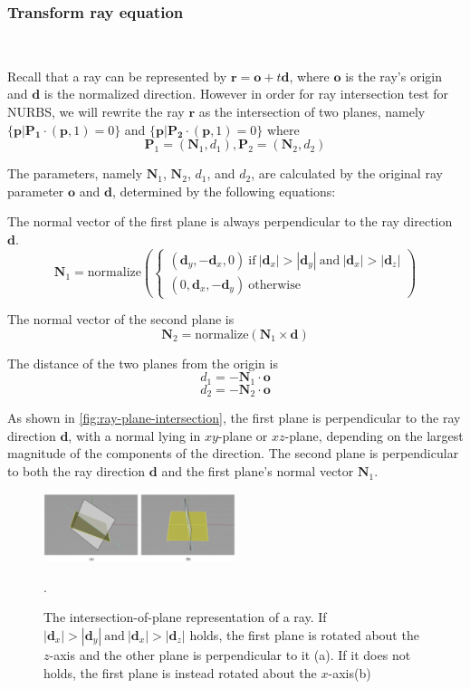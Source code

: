 \documentclass[acmtog]{acmart}
\begin{document}
\subsubsection{Transform ray equation}
\ 

Recall that a ray can be represented by $\mathbf{r} = \mathbf{o} + t \mathbf{d}$, where $\mathbf{o}$ is the ray's origin and $\mathbf{d}$ is the normalized direction. However in order for ray intersection test for NURBS, we will rewrite the ray $\mathbf{r}$ as the intersection of two planes, namely $\{ \mathbf{p} | \mathbf{P_1} \cdot (\mathbf{p}, 1) = 0 \}$ and $\{ \mathbf{p} | \mathbf{P_2} \cdot (\mathbf{p}, 1) = 0 \}$ where 
\[
	\mathbf{P}_1 = (\mathbf{N}_1, d_1), 
	\mathbf{P}_2 = (\mathbf{N}_2, d_2)	
\]

The parameters, namely $\mathbf{N}_1$, $\mathbf{N}_2$, $d_1$, and $d_2$, are calculated by the original ray parameter $\mathbf{o}$ and $\mathbf{d}$, determined by the following equations:

The normal vector of the first plane is always perpendicular to the ray direction $\mathbf{d}$.  
\[
	\mathbf{N}_1 = \mathrm{normalize}\left( \begin{cases}
		\left(\mathbf{d}_y, -\mathbf{d}_x, 0\right)
		\mathrm{\ if\ } |\mathbf{d}_x| > |\mathbf{d}_y| \mathrm{\ and\ } |\mathbf{d}_x| > |\mathbf{d}_z| \\
		\left(0, \mathbf{d}_x, -\mathbf{d}_y\right)
		\mathrm{\ otherwise}
	\end{cases}	\right)
\]

The normal vector of the second plane is 
\[
	\mathbf{N}_2 = \mathrm{normalize}\left( \mathbf{N}_1 \times \mathbf{d} \right)
\]

The distance of the two planes from the origin is
\[
	d_1 = -\mathbf{N}_1 \cdot \mathbf{o}	
\]
\[
	d_2 = -\mathbf{N}_2 \cdot \mathbf{o}	
\]

As shown in \ref{fig:ray-plane-intersection}, the first plane is perpendicular to the ray direction $\mathbf{d}$, with a normal lying in $xy$-plane or $xz$-plane, depending on the largest magnitude of the components of the direction. The second plane is perpendicular to both the ray direction $\mathbf{d}$ and the first plane's normal vector $\mathbf{N}_1$.

\begin{figure}[H]
	\centering
	\includegraphics[width=0.5\textwidth]{pictures/ray-plane.jpg}
	\caption{The intersection-of-plane representation of a ray. If $|\mathbf{d}_x| > |\mathbf{d}_y| \mathrm{\ and\ } |\mathbf{d}_x| > |\mathbf{d}_z|$ holds, the first plane is rotated about the $z$-axis and the other plane is perpendicular to it (a). If it does not holds, the first plane is instead rotated about the $x$-axis(b)}.
	\label{fig:ray-representation}
\end{figure}
\end{document}
